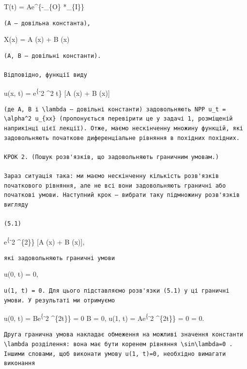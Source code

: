\documentclass[
  ukrainian,
]{article}
\begin{document}
T(t) = Ae\^{}\{-\gamma *\_\{O\} *\_\{I\}\}

\begin{verbatim}
(A — довільна константа),
\end{verbatim}

X(x) = A \sin(\lambda x) + B \cos(\lambda x)

\begin{verbatim}
(A, B — довільні константи).

Відповідно, функції виду
\end{verbatim}

u(x, t) = e\textsuperscript{\{-\lambda}2 \alpha\^{}2 t\} {[}A
\sin(\lambda x) + B \cos(\lambda x){]}

\begin{verbatim}
(де A, B і \lambda — довільні константи) задовольняють NPP u_t = \alpha^2 u_{xx} (пропонується перевірити це у задачі 1, розміщеній наприкінці цієї лекції). Отже, маємо нескінченну множину функцій, які задовольняють початкове диференціальне рівняння в похідних похідних.

КРОК 2. (Пошук розв'язків, що задовольняють граничним умовам.)

Зараз ситуація така: ми маємо нескінченну кількість розв'язків початкового рівняння, але не всі вони задовольняють граничні або початкові умови. Наступний крок — вибрати таку підмножину розв'язків вигляду

(5.1)
\end{verbatim}

e\textsuperscript{\{-\lambda}2 \alpha\^{}\{2\ell\}\} {[}A
\sin(\lambda x) + B \cos(\lambda x){]},

\begin{verbatim}
які задовольняють граничні умови
\end{verbatim}

u(0, t) = 0,

\begin{verbatim}
u(1, t) = 0. Для цього підставляємо розв'язки (5.1) у ці граничні умови. У результаті ми отримуємо
\end{verbatim}

u(0, t) = Be\textsuperscript{\{-\lambda}2 \alpha\^{}\{2t\}\} = 0
\Rightarrow B = 0, u(1, t) = Ae\textsuperscript{\{-\lambda}2
\alpha\^{}\{2t\}\} \sin \lambda = 0 \Rightarrow \sin \lambda = 0.

\begin{verbatim}
Друга гранична умова накладає обмеження на можливі значення константи \lambda розділення: вона має бути коренем рівняння \sin\lambda=0 . Іншими словами, щоб виконати умову u(1, t)=0, необхідно вимагати виконання
\end{verbatim}
\end{document}
